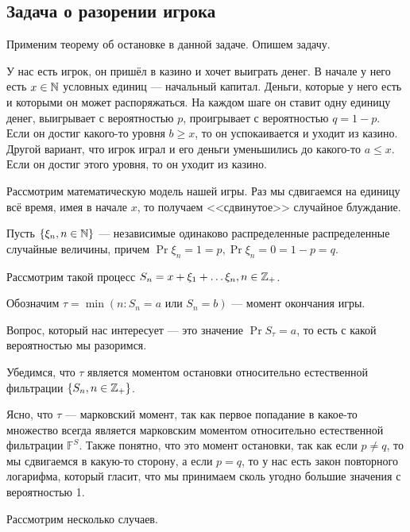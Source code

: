\subsection{Задача о разорении игрока}

Применим теорему об остановке в данной задаче. Опишем задачу.

У нас есть игрок, он пришёл в казино и хочет выиграть денег. В начале у него
есть $x \in \mathbb{N}$ условных единиц --- начальный капитал. Деньги, которые у него есть
и которыми он может распоряжаться. На каждом шаге он ставит одну единицу денег,
выигрывает с вероятностью $p$, проигрывает с вероятностью $q = 1 - p$. Если
он достиг какого-то уровня $b \geq x$, то он успокаивается и уходит из казино.
Другой вариант, что игрок играл и его деньги уменьшились до какого-то $a \leq x$.
Если он достиг этого уровня, то он уходит из казино.

Рассмотрим математическую модель нашей игры. Раз мы сдвигаемся на единицу всё время,
имея в начале $x$, то получаем <<сдвинутое>> случайное блуждание.

Пусть $\{\xi_n, n \in \mathbb{N}\}$ --- независимые одинаково распределенные распределенные
случайные величины, причем $\Pr{\xi_n = 1} = p, \Pr{\xi_n = 0} = 1 - p = q$.

Рассмотрим такой процесс $S_n = x + \xi_1 + \ldots \xi_n, n \in \mathbb{Z}_+$.

Обозначим $\tau = \min(n : S_n = a \text{ или } S_n = b)$ --- момент окончания
игры.

Вопрос, который нас интересует --- это значение $\Pr{S_\tau = a}$, то есть с какой
вероятностью мы разоримся.

Убедимся, что $\tau$ является моментом остановки относительно естественной фильтрации
$\{S_n, n \in \mathbb{Z}_+\}$. 

Ясно, что $\tau$ --- марковский момент, так как первое попадание в какое-то множество
всегда является марковским моментом относительно естественной фильтрации $\mathbb{F}^S$.
Также понятно, что это момент остановки, так как если $p \neq q$, то мы сдвигаемся
в какую-то сторону, а если $p = q$, то у нас есть закон повторного логарифма,
который гласит, что мы принимаем сколь угодно большие значения с вероятностью 1.

Рассмотрим несколько случаев.

